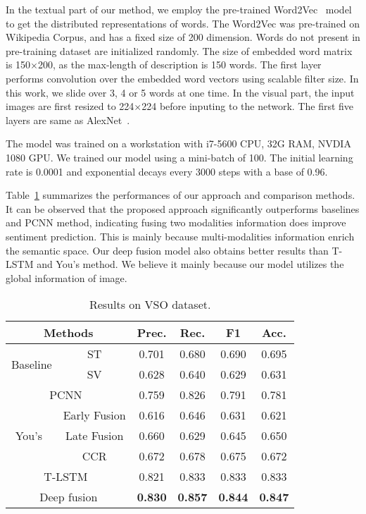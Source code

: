 \documentclass{article}
\begin{document}
In the textual part of our method, we employ the pre-trained Word2Vec~\cite{mikolov2013distributed} model to get the distributed representations of words. The Word2Vec was pre-trained on Wikipedia Corpus, and has a fixed size of 200 dimension. Words do not present in pre-training dataset are initialized randomly. The size of embedded word matrix is 150$\times$200, as the max-length of description is 150 words. The first layer performs convolution over the embedded word vectors using scalable filter size. In this work,  we slide over 3, 4 or 5 words at one time.
In the visual part,  the input images are first resized to 224$\times$224 before inputing to the network. The first five layers are same as AlexNet~\cite{krizhevsky2012imagenet}.

The model was trained on a workstation with i7-5600 CPU, 32G RAM, NVDIA 1080 GPU. We trained our model using a mini-batch of 100. The initial learning rate is 0.0001 and exponential decays  every 3000 steps with a base of 0.96.

Table~\ref{tab:VSO} summarizes the performances of our approach and comparison methods. It can be observed that the \mbox{proposed} approach significantly outperforms baselines and PCNN method, indicating fusing two modalities information does improve sentiment prediction. This is mainly because multi-modalities information enrich the semantic space. Our deep fusion model also obtains better results than T-LSTM and \mbox{You's} method. We believe it mainly because our model utilizes the global information of image.
 \vspace{-0.4cm}
\begin{table}[h]
	\centering
	\small
	\caption{Results on VSO dataset.}
	\label{tab:VSO}
	\begin{tabular}{c|c|c|c|c|c}
        \hline
        \multicolumn{2}{c|}{\textbf{Methods}} & \textbf{Prec.} & \textbf{Rec.} & \textbf{F1} & \textbf{Acc.} \\
        \hline
        \multirow{2}{*}{Baseline}& ST& 0.701 & 0.680 & 0.690 & 0.695  \\
        \cline{2-6}
                                 & SV & 0.628 & 0.640 & 0.629 & 0.631   \\
        \hline
       \multicolumn{2}{c|}{PCNN~\cite{you2015robust}} & 0.759 & 0.826 & 0.791 & 0.781  \\\hline
        \multirow{3}{*}{You's~\cite{you2016cross}}&Early Fusion & 0.616 & 0.646 & 0.631 & 0.621  \\
        \cline{2-6}
        &Late Fusion& 0.660 & 0.629 & 0.645 & 0.650  \\
        \cline{2-6}
        &CCR & 0.672 & 0.678 & 0.675 & 0.672  \\\hline
        \multicolumn{2}{c|}{T-LSTM~\cite{you2016robust}} & 0.821 & 0.833 & 0.833 & 0.833  \\\hline
        \multicolumn{2}{c|}{ Deep fusion} & \textbf{0.830} & \textbf{0.857} & \textbf{0.844} & \textbf{0.847}  \\
        \hline
	\end{tabular}
	\vspace{-0.3cm}
\end{table}
\end{document}
